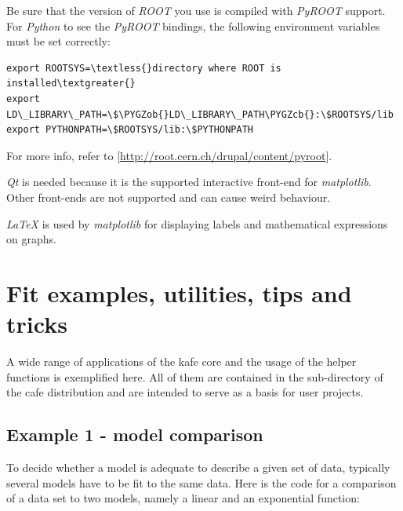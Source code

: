 \documentclass[a4paper,10pt,english]{sphinxmanual}
\def\PYGZob{\char`\{}
\def\PYGZcb{\char`\}}
\begin{document}
Be sure that the version of \emph{ROOT} you use is compiled with \emph{PyROOT} support.
For \emph{Python} to see the \emph{PyROOT} bindings, the following environment variables
must be set correctly:

\begin{Verbatim}[commandchars=\\\{\}]
export ROOTSYS=\textless{}directory where ROOT is installed\textgreater{}
export LD\_LIBRARY\_PATH=\$\PYGZob{}LD\_LIBRARY\_PATH\PYGZcb{}:\$ROOTSYS/lib
export PYTHONPATH=\$ROOTSYS/lib:\$PYTHONPATH
\end{Verbatim}

For more info, refer to {[}\href{http://root.cern.ch/drupal/content/pyroot}{http://root.cern.ch/drupal/content/pyroot}{]}.

\emph{Qt} is needed because it is the supported interactive front-end for
\emph{matplotlib}. Other front-ends are not supported and can cause weird behaviour.

\emph{LaTeX} is used by \emph{matplotlib} for displaying labels and mathematical
expressions on graphs.


\chapter{Fit examples, utilities, tips and tricks}
\label{index:fit-examples-utilities-tips-and-tricks}
A wide range of applications of the kafe core and the usage of
the helper functions is exemplified here. All of them
are contained in the sub-directory  of the
cafe distribution and are intended to serve as a basis for
user projects.


\section{Example 1 - model comparison}
\label{index:example-1-model-comparison}
To decide whether a model is adequate to describe a given
set of data, typically several models have to be fit to the
same data. Here is the code for a comparison of a data set
to two models, namely a linear and an exponential function:
\end{document}
